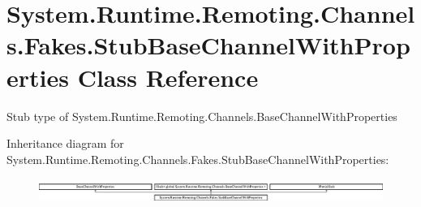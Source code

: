 \hypertarget{class_system_1_1_runtime_1_1_remoting_1_1_channels_1_1_fakes_1_1_stub_base_channel_with_properties}{\section{System.\-Runtime.\-Remoting.\-Channels.\-Fakes.\-Stub\-Base\-Channel\-With\-Properties Class Reference}
\label{class_system_1_1_runtime_1_1_remoting_1_1_channels_1_1_fakes_1_1_stub_base_channel_with_properties}
}


Stub type of System.\-Runtime.\-Remoting.\-Channels.\-Base\-Channel\-With\-Properties 


Inheritance diagram for System.\-Runtime.\-Remoting.\-Channels.\-Fakes.\-Stub\-Base\-Channel\-With\-Properties\-:\begin{figure}[H]
\begin{center}
\leavevmode
\includegraphics[height=0.792640cm]{class_system_1_1_runtime_1_1_remoting_1_1_channels_1_1_fakes_1_1_stub_base_channel_with_properties}
\end{center}
\end{figure}
